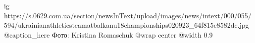  
 
 
 
 

\ifcmt
  ig https://s.0629.com.ua/section/newsInText/upload/images/news/intext/000/055/594/ukrainianathleticsteamatbalkanu18championships020923_64f815c8582de.jpg
	@caption_here Фото: Kristina Romaschuk
  @wrap center
  @width 0.9
\fi
